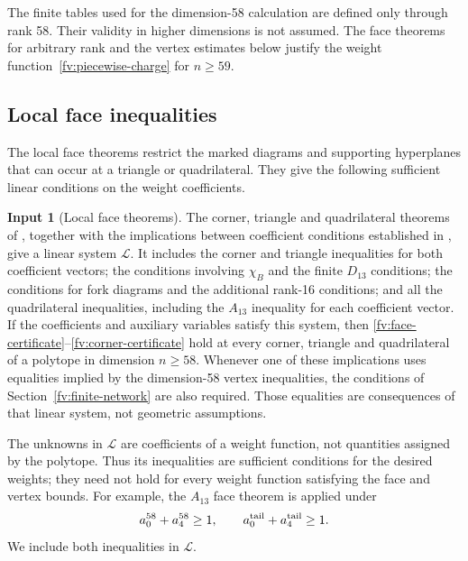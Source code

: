 \documentclass[11pt]{article}
\theoremstyle{definition}
\newtheorem{assumption}[theorem]{Input}
\theoremstyle{remark}
\numberwithin{equation}{section}
\begin{document}
The finite tables used for the dimension-58 calculation are defined
only through rank 58. Their validity in higher dimensions is not
assumed. The face theorems for arbitrary rank and the vertex estimates
below justify the weight function~\eqref{fv:piecewise-charge} for
$n\ge59$.

\subsection{Local face inequalities}
\label{fv:face-inputs}

The local face theorems restrict the marked diagrams and supporting
hyperplanes that can occur at a triangle or quadrilateral. They give
the following sufficient linear conditions on the weight coefficients.

\begin{assumption}[Local face theorems]\label{fv:face-assumption}
The corner, triangle and quadrilateral theorems of
\cite{BoundsSupplement}, together with the implications between
coefficient conditions established in \cite{LPRepository}, give a
linear system $\mathcal L$.
It includes the corner and triangle inequalities for both coefficient
vectors; the conditions involving $\chi_B$ and the finite $D_{13}$ conditions;
the conditions for fork diagrams and the additional rank-16 conditions;
and all the quadrilateral inequalities, including the $A_{13}$
inequality for each coefficient vector. If the coefficients and
auxiliary variables satisfy this system, then
\eqref{fv:face-certificate}--\eqref{fv:corner-certificate} hold at
every corner, triangle and quadrilateral of a polytope in dimension
$n\ge58$. Whenever one of these implications uses equalities
implied by the dimension-58 vertex inequalities, the conditions of
Section~\ref{fv:finite-network} are also required. Those equalities
are consequences of that linear system, not geometric assumptions.
\end{assumption}

The unknowns in $\mathcal L$ are coefficients of a weight function,
not quantities assigned by the polytope. Thus its inequalities are
sufficient conditions for the desired weights; they need not hold for
every weight function satisfying the face and vertex bounds. For
example, the $A_{13}$ face theorem is applied under
\begin{equation}\label{fv:A13-rows}
 a^{58}_0+a^{58}_4\ge1,
 \qquad a^{\rm tail}_0+a^{\rm tail}_4\ge1.
\end{equation}
We include both inequalities in $\mathcal L$.
\end{document}
